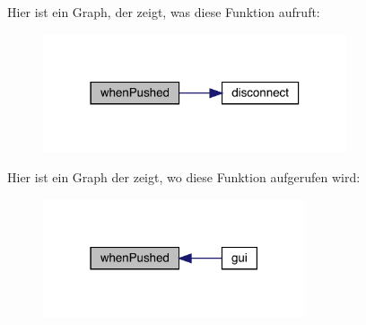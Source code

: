 Hier ist ein Graph, der zeigt, was diese Funktion aufruft\+:\nopagebreak
\begin{figure}[H]
\begin{center}
\leavevmode
\includegraphics[width=254pt]{gui_8cpp_aa0976691d9932853389991b8459ebd85_cgraph}
\end{center}
\end{figure}
Hier ist ein Graph der zeigt, wo diese Funktion aufgerufen wird\+:\nopagebreak
\begin{figure}[H]
\begin{center}
\leavevmode
\includegraphics[width=219pt]{gui_8cpp_aa0976691d9932853389991b8459ebd85_icgraph}
\end{center}
\end{figure}
